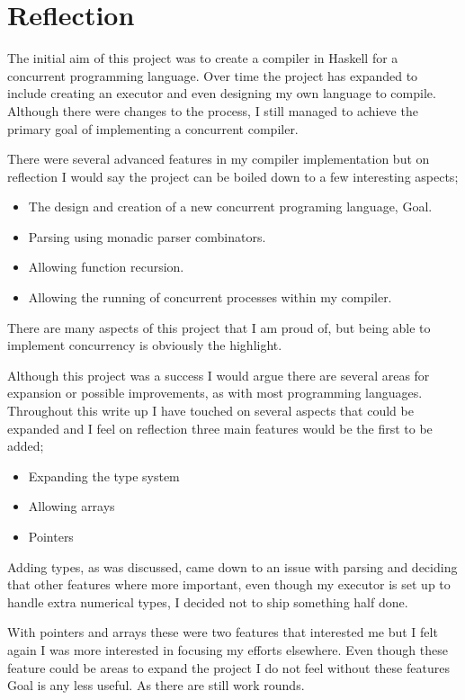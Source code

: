 
\chapter{Reflection}

The initial aim of this project was to create a compiler in Haskell for a concurrent programming language. Over time the project has expanded to include creating an executor and even designing my own language to compile. Although there were changes to the process, I still managed to achieve the primary goal of implementing a concurrent compiler.

There were several advanced features in my compiler implementation but on reflection I would say the project can be boiled down to a few interesting aspects;

\begin{itemize}
\item The design and creation of a new concurrent programing language, Goal.
\item Parsing using monadic parser combinators.
\item Allowing function recursion. 
\item Allowing the running of concurrent processes within my compiler.
\end{itemize}

There are many aspects of this project that I am proud of, but being able to implement concurrency is obviously the highlight. 

Although this project was a success I would argue there are several areas for expansion or possible improvements, as with most programming languages. Throughout this write up I have touched on several aspects that could be expanded and I feel on reflection three main features would be the first to be added; 

\begin{itemize}
\item Expanding the type system
\item Allowing arrays 
\item Pointers
\end{itemize}    

Adding types, as was discussed, came down to an issue with parsing and deciding that other features where more important, even though my executor is set up to handle extra numerical types, I decided not to ship something half done.

With pointers and arrays these were two features that interested me but I felt again I was more interested in focusing my efforts elsewhere. Even though these feature could be areas to expand the project I do not feel without these features Goal is any less useful. As there are still work rounds.

